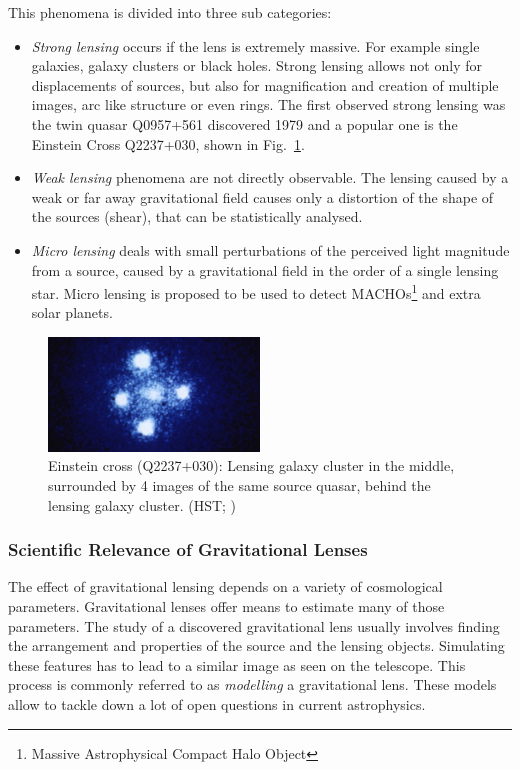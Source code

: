 \documentclass[11pt]{article}
\begin{document}
This phenomena is divided into three sub categories:
\begin{itemize}
  \item
    \emph{Strong lensing} occurs if the lens is extremely massive. For example single galaxies, galaxy clusters or black holes.
    Strong lensing allows not only for displacements of sources, but also for magnification and creation of multiple images, arc like structure or even rings.
    The first observed strong lensing was the twin quasar Q0957+561 discovered 1979\cite{walsh19790957} and a popular one is the Einstein Cross Q2237+030\cite{ec1985}, shown in Fig.~\ref{fig:einsteinc}.
  \item
    \emph{Weak lensing} phenomena are not directly observable.
    The lensing caused by a weak or far away gravitational field causes only a distortion of the shape of the sources (shear), that can be statistically analysed.
  \item
    \emph{Micro lensing} deals with small perturbations of the perceived light magnitude from a source, caused by a gravitational field in the order of a single lensing star.
    Micro lensing is proposed to be used to detect MACHOs\footnote{Massive Astrophysical Compact Halo Object} and extra solar planets.
\end{itemize}

\begin{figure}[h]
	\centering
		\includegraphics[width=0.5\textwidth]{img/einstein_cross}
	\caption{Einstein cross (Q2237+030): Lensing galaxy cluster in the middle, surrounded by 4 images of the same source quasar, behind the lensing galaxy cluster. (HST; \cite{ec1985})}
	\label{fig:einsteinc}
\end{figure}


\subsubsection{Scientific Relevance of Gravitational Lenses}

The effect of gravitational lensing depends on a variety of cosmological parameters.
Gravitational lenses offer means to estimate many of those parameters.
The study of a discovered gravitational lens usually involves finding the arrangement and properties of the source and the lensing objects.
Simulating these features has to lead to a similar image as seen on the telescope.
This process is commonly referred to as \emph{modelling} a gravitational lens.
These models allow to tackle down a lot of open questions in current astrophysics.
\end{document}
